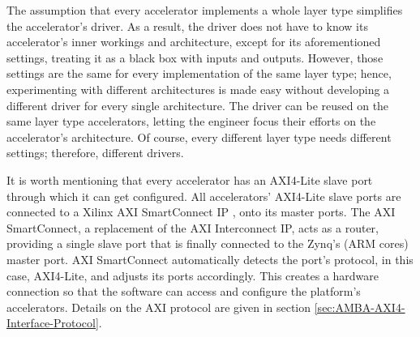 The assumption that every accelerator implements a whole layer type simplifies the accelerator's driver. As a result, the driver does not have to know its accelerator's inner workings and architecture, except for its aforementioned settings, treating it as a black box with inputs and outputs. However, those settings are the same for every implementation of the same layer type; hence, experimenting with different architectures is made easy without developing a different driver for every single architecture. The driver can be reused on the same layer type accelerators, letting the engineer focus their efforts on the accelerator's architecture. Of course, every different layer type needs different settings; therefore, different drivers.

It is worth mentioning that every accelerator has an AXI4-Lite \cite{UG1037-Vivado-Design-Suite-AXI-Reference-Guide} slave port through which it can get configured. All accelerators' AXI4-Lite slave ports are connected to a Xilinx AXI SmartConnect IP \cite{PG247-SmartConnect-Product-Guide}, onto its master ports. The AXI SmartConnect, a replacement of the AXI Interconnect IP, acts as a router, providing a single slave port that is finally connected to the Zynq's (ARM cores) master port. AXI SmartConnect automatically detects the port's protocol, in this case, AXI4-Lite, and adjusts its ports accordingly. This creates a hardware connection so that the software can access and configure the platform's accelerators. Details on the AXI protocol are given in section \ref{sec:AMBA-AXI4-Interface-Protocol}.

